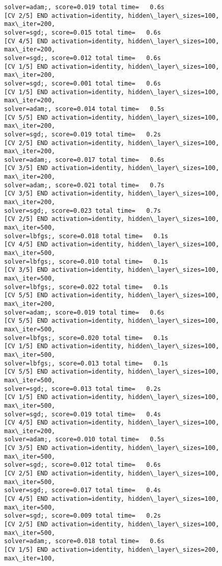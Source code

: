 \documentclass[11pt]{article}
\begin{document}
\begin{Verbatim}[commandchars=\\\{\}]
solver=adam;, score=0.019 total time=   0.6s
[CV 2/5] END activation=identity, hidden\_layer\_sizes=100, max\_iter=200,
solver=sgd;, score=0.015 total time=   0.6s
[CV 4/5] END activation=identity, hidden\_layer\_sizes=100, max\_iter=200,
solver=sgd;, score=0.012 total time=   0.6s
[CV 1/5] END activation=identity, hidden\_layer\_sizes=100, max\_iter=200,
solver=sgd;, score=0.001 total time=   0.6s
[CV 1/5] END activation=identity, hidden\_layer\_sizes=100, max\_iter=200,
solver=adam;, score=0.014 total time=   0.5s
[CV 5/5] END activation=identity, hidden\_layer\_sizes=100, max\_iter=200,
solver=sgd;, score=0.019 total time=   0.2s
[CV 2/5] END activation=identity, hidden\_layer\_sizes=100, max\_iter=200,
solver=adam;, score=0.017 total time=   0.6s
[CV 3/5] END activation=identity, hidden\_layer\_sizes=100, max\_iter=200,
solver=adam;, score=0.021 total time=   0.7s
[CV 3/5] END activation=identity, hidden\_layer\_sizes=100, max\_iter=200,
solver=sgd;, score=0.023 total time=   0.7s
[CV 2/5] END activation=identity, hidden\_layer\_sizes=100, max\_iter=500,
solver=lbfgs;, score=0.018 total time=   0.1s
[CV 4/5] END activation=identity, hidden\_layer\_sizes=100, max\_iter=500,
solver=lbfgs;, score=0.010 total time=   0.1s
[CV 3/5] END activation=identity, hidden\_layer\_sizes=100, max\_iter=500,
solver=lbfgs;, score=0.022 total time=   0.1s
[CV 5/5] END activation=identity, hidden\_layer\_sizes=100, max\_iter=200,
solver=adam;, score=0.019 total time=   0.6s
[CV 5/5] END activation=identity, hidden\_layer\_sizes=100, max\_iter=500,
solver=lbfgs;, score=0.020 total time=   0.1s
[CV 1/5] END activation=identity, hidden\_layer\_sizes=100, max\_iter=500,
solver=lbfgs;, score=0.013 total time=   0.1s
[CV 5/5] END activation=identity, hidden\_layer\_sizes=100, max\_iter=500,
solver=sgd;, score=0.013 total time=   0.2s
[CV 1/5] END activation=identity, hidden\_layer\_sizes=100, max\_iter=500,
solver=sgd;, score=0.019 total time=   0.4s
[CV 4/5] END activation=identity, hidden\_layer\_sizes=100, max\_iter=200,
solver=adam;, score=0.010 total time=   0.5s
[CV 3/5] END activation=identity, hidden\_layer\_sizes=100, max\_iter=500,
solver=sgd;, score=0.012 total time=   0.6s
[CV 2/5] END activation=identity, hidden\_layer\_sizes=100, max\_iter=500,
solver=sgd;, score=0.017 total time=   0.4s
[CV 4/5] END activation=identity, hidden\_layer\_sizes=100, max\_iter=500,
solver=sgd;, score=0.009 total time=   0.2s
[CV 2/5] END activation=identity, hidden\_layer\_sizes=100, max\_iter=500,
solver=adam;, score=0.018 total time=   0.6s
[CV 1/5] END activation=identity, hidden\_layer\_sizes=200, max\_iter=100,

\end{Verbatim}
\end{document}
